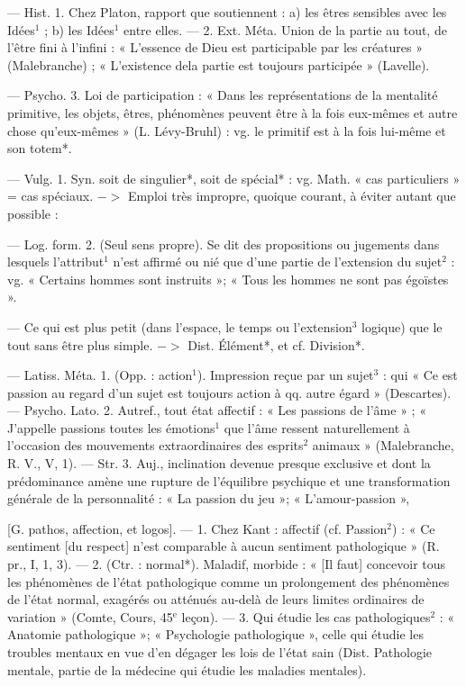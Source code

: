 \begin{itemize}[leftmargin=1cm, label=, itemsep=1pt]
 — Hist. 1. Chez Platon,
rapport que soutiennent : a) les
êtres sensibles avec les Idées$^1$ ; b) les
Idées$^1$ entre elles. — 2. Ext. Méta.
Union de la partie au tout, de l’être
fini à l'infini : « L’essence de Dieu
est participable par les créatures »
(Malebranche) ; « L'existence dela partie est toujours participée » (Lavelle).

— Psycho. 3. Loi de participation : « Dans les représentations de la
mentalité primitive, les objets, êtres,
phénomènes peuvent être à la fois
eux-mêmes et autre chose qu’eux-mêmes » (L. Lévy-Bruhl) : vg. le
primitif est à la fois lui-même et son
totem*.

 — Vulg. 1. Syn. soit de
singulier*, soit de spécial* : vg.
Math. « cas particuliers » = cas
spéciaux. $->$ Emploi très impropre,
quoique courant, à éviter autant
que possible :

— Log. form. 2. (Seul sens propre). Se dit des propositions ou jugements dans lesquels l’attribut$^1$
n'est affirmé ou nié que d’une
partie de l’extension du sujet$^2$ : vg.
« Certains hommes sont instruits »;
« Tous les hommes ne sont pas
égoïstes ».

 — Ce qui est plus petit (dans
l'espace, le temps ou l'extension$^3$
logique) que le tout sans être plus
simple. $->$ Dist. Élément*, et cf.
Division*.

 — Latiss. Méta. 1. (Opp. :
action$^1$). Impression reçue par un
sujet$^3$ : qui « Ce est passion au
regard d’un sujet est toujours action
à qq. autre égard » (Descartes). —
Psycho. Lato. 2. Autref., tout état
affectif : « Les passions de l'âme » ;
« J'appelle passions toutes les émotions$^1$ que l’âme ressent naturellement à l’occasion des mouvements
extraordinaires des esprits$^2$ animaux » (Malebranche, R. V., V, 1).
— Str. 3. Auj., inclination devenue
presque exclusive et dont la prédominance amène une rupture de
l'équilibre psychique et une transformation générale de la personnalité : « La passion du jeu »; « L'amour-passion »,

 [G. pathos, affection, et
logos]. — 1. Chez Kant : affectif (cf.
Passion$^2$) : « Ce sentiment [du respect] n’est comparable à aucun sentiment pathologique » (R. pr., I,
1, 3). — 2. (Ctr. : normal*). Maladif,
morbide : « [Il faut] concevoir tous
les phénomènes de l’état pathologique comme un prolongement des
phénomènes de l'état normal, exagérés ou atténués au-delà de leurs
limites ordinaires de variation »
(Comte, Cours, 45$^\text{e}$ leçon). — 3. Qui
étudie les cas pathologiques$^2$ : « Anatomie pathologique »; « Psychologie
pathologique », celle qui étudie les
troubles mentaux en vue d'en dégager les lois de l'état sain (Dist.
Pathologie mentale, partie de la médecine qui étudie les maladies mentales).


\end{itemize}
